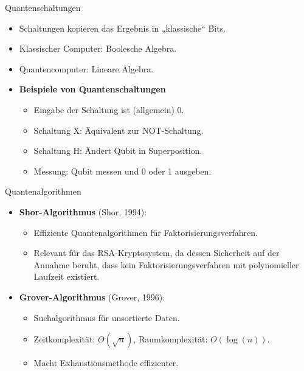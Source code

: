 \documentclass{beamer}
\begin{document}
    \begin{frame}{Quantenschaltungen}
        \begin{itemize}
            \item Schaltungen kopieren das Ergebnis in „klassische“ Bits.
            \item Klassischer Computer: Boolesche Algebra.
            \item Quantencomputer: Lineare Algebra.
            \item \textbf{Beispiele von Quantenschaltungen}
            \begin{itemize}
                \item Eingabe der Schaltung ist (allgemein) 0.
                \item Schaltung X: Äquivalent zur NOT-Schaltung.
                \item Schaltung H: Ändert Qubit in Superposition.
                \item Messung: Qubit messen und 0 oder 1 ausgeben.
            \end{itemize}
        \end{itemize}
    \end{frame}

    \begin{frame}{Quantenalgorithmen}
        \begin{itemize}
            \item \textbf{Shor-Algorithmus} (Shor, 1994):
            \begin{itemize}
                \item Effiziente Quantenalgorithmen für Faktorisierungsverfahren.
                \item Relevant für das RSA-Kryptosystem, da dessen Sicherheit auf der Annahme beruht, dass kein Faktorisierungsverfahren mit polynomieller Laufzeit existiert.
            \end{itemize}
            \item \textbf{Grover-Algorithmus} (Grover, 1996):
            \begin{itemize}
                \item Suchalgorithmus für unsortierte Daten.
                \item Zeitkomplexität: \( O(\sqrt{n}) \), Raumkomplexität: \( O(\log(n)) \).
                \item Macht Exhaustionsmethode effizienter.
            \end{itemize}
        \end{itemize}
    \end{frame}
\end{document}
